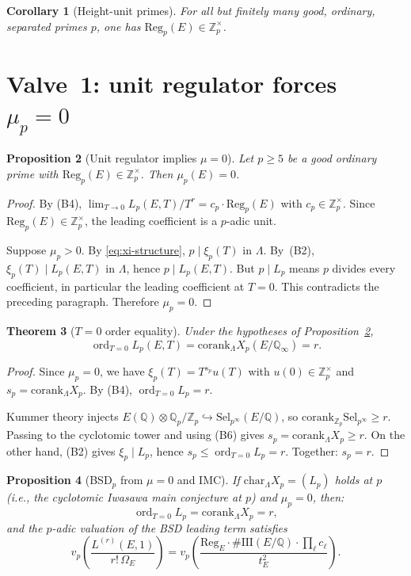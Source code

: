 \documentclass[12pt,reqno]{amsart}
\newtheorem{theorem}{Theorem}[section]
\newtheorem{proposition}[theorem]{Proposition}
\newtheorem{corollary}[theorem]{Corollary}
\theoremstyle{definition}
\theoremstyle{remark}
\newcommand{\Q}{\mathbb{Q}}
\newcommand{\Qp}{\mathbb{Q}_p}
\newcommand{\Zp}{\mathbb{Z}_p}
\newcommand{\Qinf}{\Q_\infty}
\newcommand{\Lam}{\Lambda}
\newcommand{\Sha}{\mathrm{III}}
\newcommand{\ShaE}{\Sha(E/\Q){}}
\newcommand{\chr}{\mathrm{char}}
\newcommand{\corank}{\mathrm{corank}}
\newcommand{\Sel}{\mathrm{Sel}}
\newcommand{\Reg}{\mathrm{Reg}}
\DeclareMathOperator{\ord}{ord}
\begin{document}
\begin{corollary}[Height-unit primes]\label{cor:height-unit}
For all but finitely many good, ordinary, separated primes $p$, one has $\Reg_p(E)\in\Zp^\times$.
\end{corollary}

\section{Valve~1: unit regulator forces $\mu_p=0$}\label{sec:valve1}

\begin{proposition}[Unit regulator implies $\mu=0$]\label{prop:mu-zero}
Let $p\ge 5$ be a good ordinary prime with $\Reg_p(E)\in\Zp^\times$.  Then $\mu_p(E)=0$.
\end{proposition}

\begin{proof}
By (B4), $\lim_{T\to 0}L_p(E,T)/T^r=c_p\cdot\Reg_p(E)$ with $c_p\in\Zp^\times$.  Since $\Reg_p(E)\in\Zp^\times$, the leading coefficient is a $p$-adic unit.

Suppose $\mu_p>0$.  By \eqref{eq:xi-structure}, $p\mid\xi_p(T)$ in $\Lam$.  By~(B2), $\xi_p(T)\mid L_p(E,T)$ in $\Lam$, hence $p\mid L_p(E,T)$.  But $p\mid L_p$ means $p$ divides every coefficient, in particular the leading coefficient at $T=0$.  This contradicts the preceding paragraph.  Therefore $\mu_p=0$.
\end{proof}

\begin{theorem}[$T=0$ order equality]\label{thm:T0-equality}
Under the hypotheses of Proposition~\ref{prop:mu-zero},
\[
\ord_{T=0}L_p(E,T)=\corank_\Lam X_p(E/\Qinf)=r.
\]
\end{theorem}

\begin{proof}
Since $\mu_p=0$, we have $\xi_p(T)=T^{s_p}u(T)$ with $u(0)\in\Zp^\times$ and $s_p=\corank_\Lam X_p$.  By (B4), $\ord_{T=0}L_p=r$.

Kummer theory injects $E(\Q)\otimes\Qp/\Zp\hookrightarrow\Sel_{p^\infty}(E/\Q)$, so $\corank_{\Zp}\Sel_{p^\infty}\ge r$.  Passing to the cyclotomic tower and using (B6) gives $s_p=\corank_\Lam X_p\ge r$.  On the other hand, (B2) gives $\xi_p\mid L_p$, hence $s_p\le\ord_{T=0}L_p=r$.  Together: $s_p=r$.
\end{proof}

\begin{proposition}[BSD$_p$ from $\mu=0$ and IMC]\label{prop:BSDp}
If $\chr_\Lam X_p=(L_p)$ holds at $p$ (i.e., the cyclotomic Iwasawa main conjecture at $p$) and $\mu_p=0$, then:
\[
\ord_{T=0}L_p=\corank_\Lam X_p=r,
\]
and the $p$-adic valuation of the BSD leading term satisfies
\[
v_p\!\left(\frac{L^{(r)}(E,1)}{r!\,\Omega_E}\right)
=v_p\!\left(\frac{\Reg_E\cdot\#\ShaE\cdot\prod_\ell c_\ell}{t_E^2}\right).
\]
\end{proposition}
\end{document}
